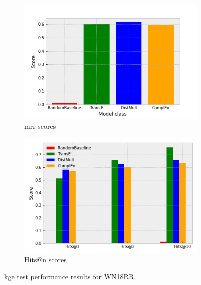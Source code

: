 \begin{figure}[htbp]
\centering
\begin{subfigure}{.5\textwidth}
  \centering
  \includegraphics[width=1\linewidth]{figures/model_selection/wn18rr_mrr.png}
  \caption{\gls{mrr} scores}
  \label{fig:model_selection_mrr_wn18rr}
\end{subfigure}%
\begin{subfigure}{.5\textwidth}
  \centering
  \includegraphics[width=1\linewidth]{figures/model_selection/wn18rr_hit_scores.png}
  \caption{Hits@n scores}
  \label{fig:model_selection_hit_scores_wn18rr}
\end{subfigure}
\caption[KGE test results for WN18RR KG.]{\gls{kge} test performance results for WN18RR.}
\label{fig:model_selection_metrics_wn18rr}
\end{figure}



